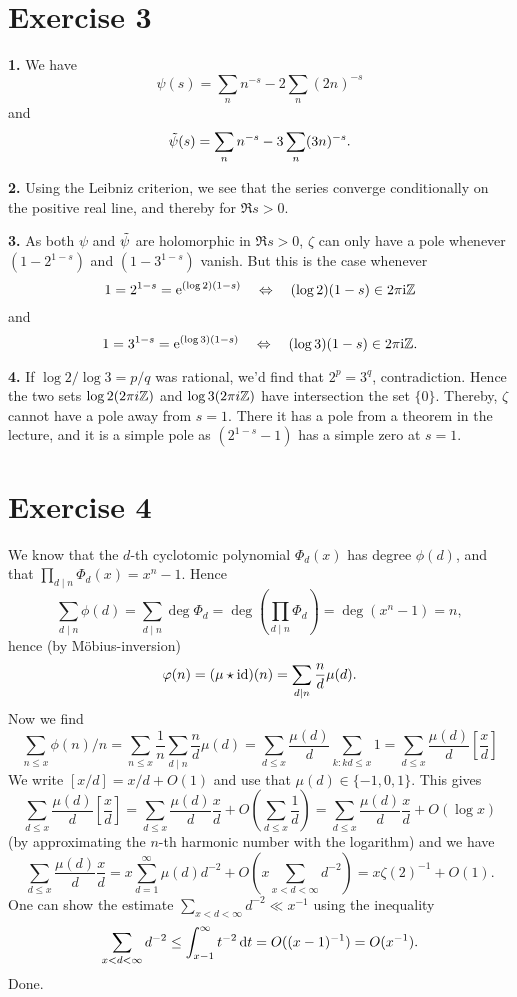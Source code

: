 \documentclass[a4paper,11pt]{article}
\begin{document}
\section*{Exercise 3}
\textbf{1.} We have
\[
    \psi(s) = \sum_{n} n^{-s} - 2 \sum_n (2n)^{-s}
\]
and 
\[
    \Tilde \psi(s) = \sum_{n} n^{-s} - 3 \sum_n (3n)^{-s}.
\]

\textbf{2.} Using the Leibniz criterion, we see that the series converge conditionally on the
positive real line, and thereby for $\Re s > 0$. 

\textbf{3.} As both $\psi$ and $\Tilde \psi$ are holomorphic in $\Re s > 0$, $\zeta$ can only
have a pole whenever $(1-2^{1-s})$ and $(1-3^{1-s})$ vanish. But this is the case whenever 
\[
    1 = 2^{1-s} = \mathrm e^{(\log 2)(1-s)} \quad \Leftrightarrow \quad (\log 2)(1-s) \in 
    2 \pi \mathrm i \mathbb{Z}
\]
and 
\[
    1 = 3^{1-s} = \mathrm e^{(\log 3)(1-s)} \quad \Leftrightarrow \quad (\log 3)(1-s) \in 
    2 \pi \mathrm i \mathbb{Z}.
\]

\textbf{4.} If $\log 2 / \log 3 = p/q$ was rational, we'd find that $2^p = 3^q$, contradiction.
Hence the two sets $\log 2 (2 \pi i \mathbb{Z})$ and $\log 3 ( 2 \pi i \mathbb{Z})$ have intersection the set
$\{0\}$. Thereby, $\zeta$ cannot have a pole away from $s = 1$. There it has a pole from a 
theorem in the lecture, and it is a simple pole as $(2^{1-s}-1)$ has a simple zero at $s=1$. 


\section*{Exercise 4}
We know that the $d$-th cyclotomic polynomial $\Phi_d(x)$ has degree $\phi(d)$, and that 
$\prod_{d \mid n} \Phi_d(x) = x^n - 1$. Hence 
\[
\sum_{d \mid n} \phi(d) = \sum_{d \mid n } \deg \Phi_d = \deg \left(\prod_{d
\mid n} \Phi_d \right) = \deg(x^n - 1) = n,
\]
hence (by Möbius-inversion)
\[
    \varphi(n) = (\mu \star \operatorname{id})(n) = \sum_{d\mid n}\frac nd \mu(d). 
\]
Now we find 
\[
    \sum_{n \leq x} \phi(n) / n = \sum_{n \leq x} \frac 1n \sum_{d \mid n}
    \frac nd \mu(d) = \sum_{d \leq x} \frac{\mu(d)}d \sum_{k : kd \leq x} 1 = 
    \sum_{d \leq x} \frac{\mu(d)}d \left[\frac xd \right] 
\]
We write $[x/d] = x/d + O(1)$ and use that $\mu(d) \in \{-1, 0, 1\}$. This gives 
\[
    \sum_{d \leq x} \frac{\mu(d)}d \left[\frac xd \right] 
    = \sum_{d \leq x} \frac{\mu(d)}d \frac xd + O\left(\sum_{d \leq x} \frac 1d \right) 
    = \sum_{d \leq x} \frac{\mu(d)}d \frac xd + O(\log x)
\]
(by approximating the $n$-th harmonic number with the logarithm) and 
we have 
\[
    \sum_{d \leq x} \frac{\mu(d)}d \frac xd = x \sum_{d = 1}^\infty \mu(d) d^{-2} + 
    O \left(x \sum_{x < d < \infty} d^{-2} \right) = x \zeta(2)^{-1} + O(1).
\]
One can show the estimate $\sum_{x < d < \infty} d^{-2} \ll x^{-1}$ using the inequality
\[
    \sum_{x < d < \infty} d^{-2} \leq \int_{x-1}^\infty t^{-2} \mathrm{\,d} t = O((x-1)^{-1}) = O(x^{-1}).
\]
Done. 
\end{document}
